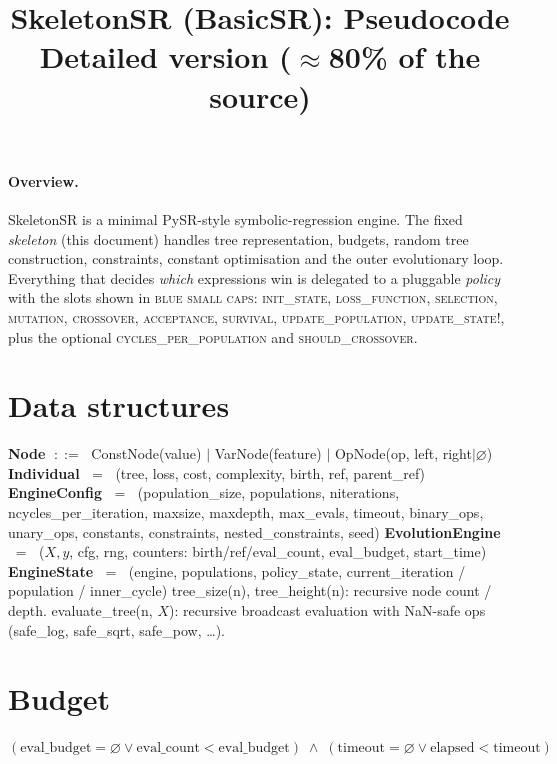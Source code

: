 \documentclass[11pt]{article}
\title{SkeletonSR (BasicSR): Pseudocode\\\large Detailed version ($\approx$80\% of the source)}
\author{}
\date{}
\newcommand{\slot}[1]{\textcolor{blue!70!black}{\textsc{#1}}}
\begin{document}
\maketitle

\paragraph{Overview.}
SkeletonSR is a minimal PySR-style symbolic-regression engine. The fixed
\emph{skeleton} (this document) handles tree representation, budgets,
random tree construction, constraints, constant optimisation and the
outer evolutionary loop. Everything that decides \emph{which} expressions
win is delegated to a pluggable \emph{policy} with the slots shown in
\textcolor{blue!70!black}{\textsc{blue small caps}}:
\slot{init\_state}, \slot{loss\_function}, \slot{selection},
\slot{mutation}, \slot{crossover}, \slot{acceptance}, \slot{survival},
\slot{update\_population}, \slot{update\_state!}, plus the optional
\slot{cycles\_per\_population} and \slot{should\_crossover}.

\section*{Data structures}
\begin{algorithmic}[1]
\State \textbf{Node} $\;::=\;$ ConstNode(value) $\mid$ VarNode(feature) $\mid$ OpNode(op, left, right$\mid\varnothing$)
\State \textbf{Individual} $\;=\;$ (tree, loss, cost, complexity, birth, ref, parent\_ref)
\State \textbf{EngineConfig} $\;=\;$ (population\_size, populations, niterations, ncycles\_per\_iteration, maxsize, maxdepth,
\Statex \hspace{2.2em} max\_evals, timeout, binary\_ops, unary\_ops, constants, constraints, nested\_constraints, seed)
\State \textbf{EvolutionEngine} $\;=\;$ ($X, y$, cfg, rng, counters: birth/ref/eval\_count, eval\_budget, start\_time)
\State \textbf{EngineState} $\;=\;$ (engine, populations, policy\_state, current\_iteration / population / inner\_cycle)
\State tree\_size(n), tree\_height(n): recursive node count / depth.
\State evaluate\_tree(n, $X$): recursive broadcast evaluation with NaN-safe ops (safe\_log, safe\_sqrt, safe\_pow, \dots).
\end{algorithmic}

\section*{Budget}
\begin{algorithmic}[1]
  \State \Return $(\text{eval\_budget} = \varnothing \lor \text{eval\_count} < \text{eval\_budget}) \;\land\; (\text{timeout} = \varnothing \lor \text{elapsed} < \text{timeout})$
\EndFunction
\end{algorithmic}
\end{document}
